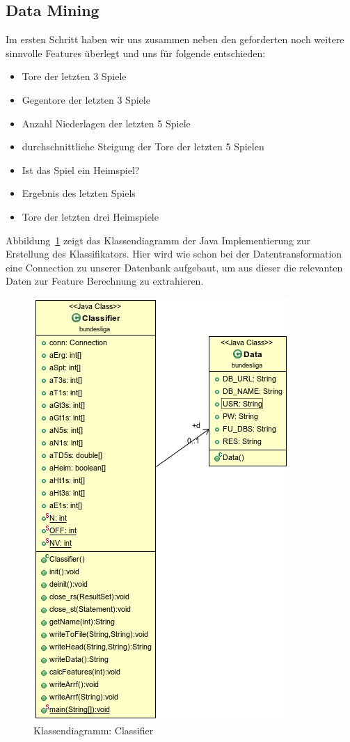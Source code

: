 \documentclass[
10pt,
a4paper
]{scrartcl}
\begin{document}
\subsection{Data Mining}

Im ersten Schritt haben wir uns zusammen neben den geforderten noch weitere sinnvolle Features überlegt und uns für folgende entschieden:

 \begin{itemize}
  \item Tore der letzten 3 Spiele
  \item Gegentore der letzten 3 Spiele
  \item Anzahl Niederlagen der letzten 5 Spiele
  \item durchschnittliche Steigung der Tore der letzten 5 Spielen
  \item Ist das Spiel ein Heimspiel?
  \item Ergebnis des letzten Spiels
  \item Tore der letzten drei Heimspiele
 \end{itemize}

Abbildung~\ref{fig:classi} zeigt das Klassendiagramm der Java Implementierung zur Erstellung des Klassifikators. Hier wird wie schon bei der Datentransformation eine Connection zu unserer Datenbank aufgebaut, um aus dieser die relevanten Daten zur Feature Berechnung zu extrahieren.\\

\begin{figure}[H]
\centering
  \includegraphics[scale=0.6]{Classifier.png}
\caption{Klassendiagramm: Classifier}
\label{fig:classi}
\end{figure}
\end{document}
